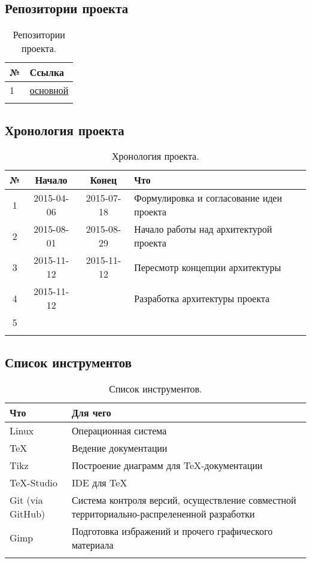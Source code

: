 \documentclass[12pt,a4paper,fullpage,titlepage]{article}
\begin{document}
\subsection{Репозитории проекта}
\begin{table}[h]
	\begin{tabularx}{\textwidth}{|l|X|}
		\hline
		№ & Ссылка \\
		\hline
		1 & \href{https://github.com/taptap/ladders}{основной} \\
		\hline
		& \\
		\hline
	\end{tabularx}
	\caption{Репозитории проекта.}
\end{table}

\subsection{Хронология проекта}
\begin{table}[h]
\begin{tabularx}{\textwidth}{|c|c|c|X|}
	\hline
	№ & Начало & Конец & Что\\
	\hline
	1 & 2015-04-06 & 2015-07-18 & Формулировка и согласование идеи проекта \\
	\hline
	2 & 2015-08-01 & 2015-08-29 & Начало работы над архитектурой проекта \\
	\hline
	3 & 2015-11-12 & 2015-11-12 & Пересмотр концепции архитектуры \\
	\hline
	4 & 2015-11-12 &  & Разработка архитектуры проекта\\
	\hline
	5 &  &  &  \\
	\hline
	&  &  &  \\
	\hline
\end{tabularx}
\caption{Хронология проекта.}
\end{table}

\subsection{Список инструментов}
\begin{table}[h]
	\begin{tabularx}{\textwidth}{|l|X|}
		\hline
		Что & Для чего \\
		\hline
		Linux & Операционная система\\
		\hline
		\TeX & Ведение документации\\
		\hline
		Tikz & Построение диаграмм для \TeX-документации\\
		\hline
		\TeX-Studio & IDE для \TeX \\
		\hline
		Git (via GitHub) & Система контроля версий, осуществление совместной территориально-распрелененной разработки \\
		\hline
		Gimp & Подготовка избражений и прочего графического материала \\
		\hline
		& \\
		\hline
	\end{tabularx}
	\caption{Список инструментов.}
\end{table}
\end{document}
